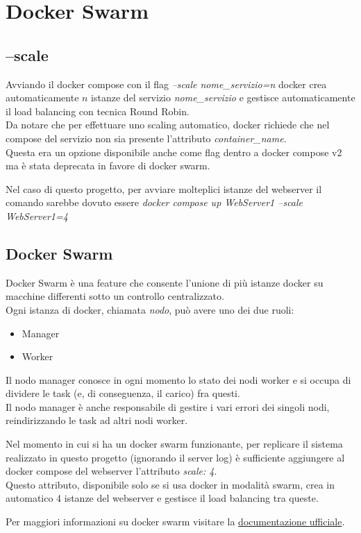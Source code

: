 \documentclass[../DocumentazioneProgetto.tex]{subfiles}
\begin{document}
	\section{Docker Swarm}
	\label{sec:DockerSwarm}
	\subsection{--scale} 
	Avviando il docker compose con il flag \textit{--scale nome\_servizio=n} docker crea automaticamente \(n\) istanze del servizio \textit{nome\_servizio} e gestisce automaticamente il load balancing con tecnica Round Robin.\\
	Da notare che per effettuare uno scaling automatico, docker richiede che nel compose del servizio non sia presente l'attributo \textit{container\_name}.\\ 
	Questa era un opzione disponibile anche come flag dentro a docker compose v2 ma è stata deprecata in favore di docker swarm. 

	Nel caso di questo progetto, per avviare molteplici istanze del webserver il comando sarebbe dovuto essere \textit{docker compose up WebServer1 --scale WebServer1=4} 
	\subsection{Docker Swarm} 
	Docker Swarm è una feature che consente l'unione di più istanze docker su macchine differenti sotto un controllo centralizzato.\\
	Ogni istanza di docker, chiamata \textit{nodo}, può avere uno dei due ruoli: 
	\begin{itemize}
		\item Manager
		\item Worker
	\end{itemize}
	Il nodo manager conosce in ogni momento lo stato dei nodi worker e si occupa di dividere le task (e, di conseguenza, il carico) fra questi.\\
	Il nodo manager è anche responsabile di gestire i vari errori dei singoli nodi, reindirizzando le task ad altri nodi worker.

	Nel momento in cui si ha un docker swarm funzionante, per replicare il sistema realizzato in questo progetto (ignorando il server log) è sufficiente aggiungere al docker compose del webserver l'attributo \textit{scale: 4}.\\
	Questo attributo, disponibile solo se si usa docker in modalità swarm, crea in automatico 4 istanze del webserver e gestisce il load balancing tra queste.
	
	Per maggiori informazioni su docker swarm visitare la \href{https://docs.docker.com/engine/swarm/}{documentazione ufficiale}.
\end{document}
